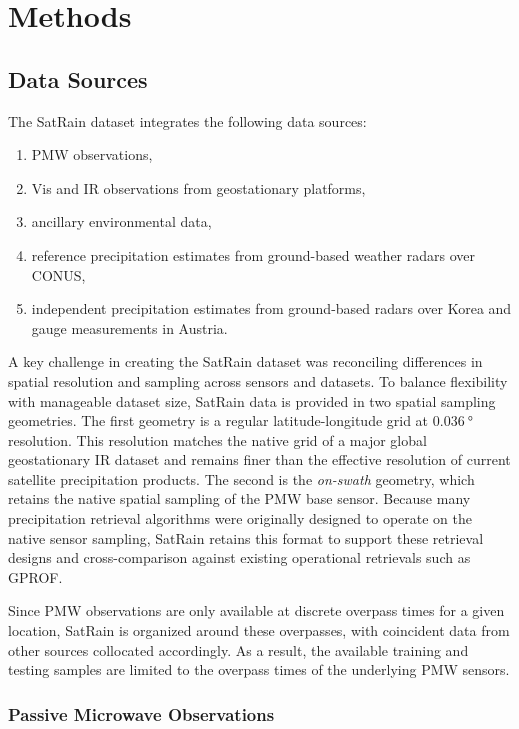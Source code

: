 \documentclass[11pt]{article}
\begin{document}
\section{Methods}

\subsection{Data Sources}

The SatRain dataset integrates the following data sources:

\begin{enumerate}
	\item PMW observations,
	\item Vis and IR observations from geostationary platforms,
	\item ancillary environmental data,
	\item reference precipitation estimates from ground-based weather radars  over CONUS,
	\item independent precipitation estimates from ground-based radars over Korea and gauge measurements in Austria.
\end{enumerate}

A key challenge in creating the SatRain dataset was reconciling differences in
spatial resolution and sampling across sensors and datasets. To balance flexibility with
manageable dataset size, SatRain data is provided in two spatial sampling geometries.
The first geometry is a regular latitude-longitude grid at
$\SI{0.036}{\degree}$ resolution. This resolution matches the native grid of a
major global geostationary IR dataset \citep{NCEP_CPC_L3_IR} and remains finer
than the effective resolution of current satellite precipitation products.
The second is the \textit{on-swath} geometry, which retains the native spatial sampling of
the PMW base sensor. Because many precipitation retrieval algorithms were
originally designed to operate on the native sensor sampling, SatRain retains this
format to support these retrieval designs and cross-comparison against existing
operational retrievals such as GPROF.

Since PMW observations are only available at discrete overpass times for a given
location, SatRain is organized around these overpasses, with coincident data
from other sources collocated accordingly. As a result, the available training
and testing samples are limited to the overpass times of the underlying PMW
sensors.

\subsubsection{Passive Microwave Observations}
\end{document}

